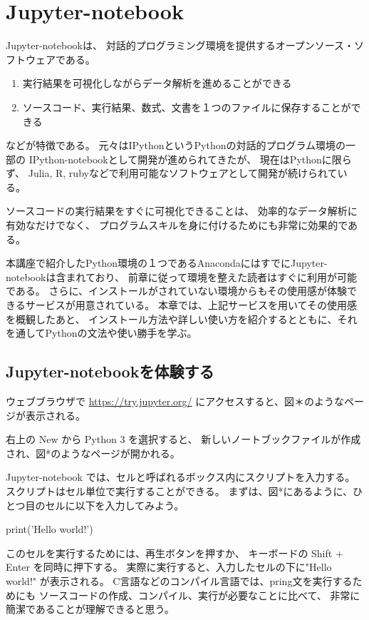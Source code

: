\section{Jupyter-notebook}

Jupyter-notebook\cite{jupyter}は、
対話的プログラミング環境を提供するオープンソース・ソフトウェアである。
%
\begin{enumerate}
  \item 実行結果を可視化しながらデータ解析を進めることができる
  \item ソースコード、実行結果、数式、文書を１つのファイルに保存することができる
\end{enumerate}
%
などが特徴である。
元々は{\ttfamily IPython}というPythonの対話的プログラム環境の一部の
{\ttfamily IPython-notebook}として開発が進められてきたが、
%
現在はPythonに限らず、
{\ttfamily Julia, R, ruby}などで利用可能なソフトウェアとして開発が続けられている。

%
ソースコードの実行結果をすぐに可視化できることは、
効率的なデータ解析に有効なだけでなく、
プログラムスキルを身に付けるためにも非常に効果的である。

本講座で紹介したPython環境の１つであるAnacondaにはすでにJupyter-notebookは含まれており、
前章に従って環境を整えた読者はすぐに利用が可能である。
さらに、インストールがされていない環境からもその使用感が体験できるサービスが用意されている。
%
本章では、上記サービスを用いてその使用感を概観したあと、
インストール方法や詳しい使い方を紹介するとともに、それを通してPythonの文法や使い勝手を学ぶ。


\subsection{Jupyter-notebookを体験する\label{subsec:experiencing}}
ウェブブラウザで
\url{https://try.jupyter.org/}
にアクセスすると、図＊のようなページが表示される。

右上の {\ttfamily New} から {\ttfamily Python 3} を選択すると、
新しいノートブックファイルが作成され、図*のようなページが開かれる。

Jupyter-notebook では、セルと呼ばれるボックス内にスクリプトを入力する。
スクリプトはセル単位で実行することができる。
まずは、図*にあるように、ひとつ目のセルに以下を入力してみよう。

{\ttfamily
print('Hello world!')
}

このセルを実行するためには、再生ボタンを押すか、
キーボードの Shift + Enter を同時に押下する。
%
実際に実行すると、入力したセルの下に"Hello world!" が表示される。
C言語などのコンパイル言語では、{\ttfamily pring}文を実行するためにも
ソースコードの作成、コンパイル、実行が必要なことに比べて、
非常に簡潔であることが理解できると思う。

